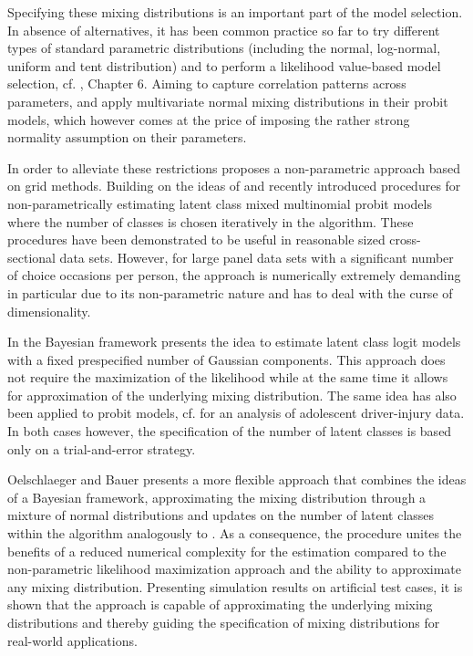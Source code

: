 \documentclass[article]{jss}
\begin{document}
Specifying these mixing distributions is an important part of the model selection. In absence of alternatives, it has been common practice so far to try different types of standard parametric distributions (including the normal, log-normal, uniform and tent distribution) and to perform a likelihood value-based model selection, cf. \cite{Train:09}, Chapter 6. Aiming to capture correlation patterns across parameters, \cite{Fountas:18} and \cite{Fountas:19} apply multivariate normal mixing distributions in their probit models, which however comes at the price of imposing the rather strong normality assumption on their parameters.

In order to alleviate these restrictions \cite{Train:16} proposes a non-parametric approach based on grid methods. Building on the ideas of \cite{Train:16} and \cite{Bhat:18} recently \cite{Bauer:19} introduced procedures for non-parametrically estimating latent class mixed multinomial probit models where the number of classes is chosen iteratively in the algorithm. These procedures have been demonstrated to be useful in reasonable sized cross-sectional data sets. However, for large panel data sets with a significant number of choice occasions per person, the approach is numerically extremely demanding in particular due to its non-parametric nature and has to deal with the curse of dimensionality.

In the Bayesian framework \cite{Scaccia:10} presents the idea to estimate latent class logit models with a fixed prespecified number of Gaussian components. This approach does not require the maximization of the likelihood while at the same time it allows for approximation of the underlying mixing distribution. The same idea has also been applied to probit models, cf. \cite{Xiong:13} for an analysis of adolescent driver-injury data. In both cases however, the specification of the number of latent classes is based only on a trial-and-error strategy.

Oelschlaeger and Bauer presents a more flexible approach that combines the ideas of a Bayesian framework, approximating the mixing distribution through a mixture of normal distributions and updates on the number of latent classes within the algorithm analogously to \cite{Bauer:19}. As a consequence, the procedure unites the benefits of a reduced numerical complexity for the estimation compared to the non-parametric likelihood maximization approach and the ability to approximate any mixing distribution. Presenting simulation results on artificial test cases, it is shown that the approach is capable of approximating the underlying mixing distributions and thereby guiding the specification of mixing distributions for real-world applications.
\end{document}
